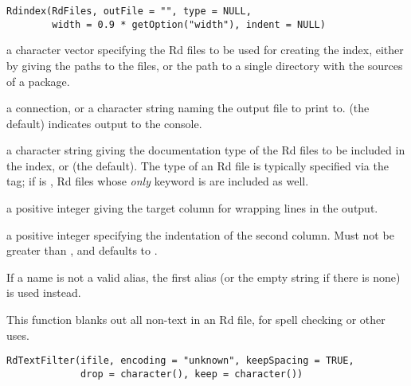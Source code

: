 %
\begin{Usage}
\begin{verbatim}
Rdindex(RdFiles, outFile = "", type = NULL,
        width = 0.9 * getOption("width"), indent = NULL)
\end{verbatim}
\end{Usage}
%
\begin{Arguments}
\begin{ldescription}
\item[\code{RdFiles}] a character vector specifying the Rd files to be used
for creating the index, either by giving the paths to the files, or
the path to a single directory with the sources of a package.
\item[\code{outFile}] a connection, or a character string naming the output
file to print to.   (the default) indicates output to the
console.
\item[\code{type}] a character string giving the documentation type of the Rd
files to be included in the index, or  (the default).
The type of an Rd file is typically specified via the
 tag; if  is , Rd files
whose \emph{only} keyword is  are included as well.
\item[\code{width}] a positive integer giving the target column for wrapping
lines in the output.
\item[\code{indent}] a positive integer specifying the indentation of the
second column.  Must not be greater than , and
defaults to .
\end{ldescription}
\end{Arguments}
%
\begin{Details}\relax
If a name is not a valid alias, the first alias (or the empty string
if there is none) is used instead.
\end{Details}
%
\begin{Description}\relax
This function blanks out all non-text in an Rd file, 
for spell checking or other uses.
\end{Description}
%
\begin{Usage}
\begin{verbatim}
RdTextFilter(ifile, encoding = "unknown", keepSpacing = TRUE,
             drop = character(), keep = character())
\end{verbatim}
\end{Usage}

